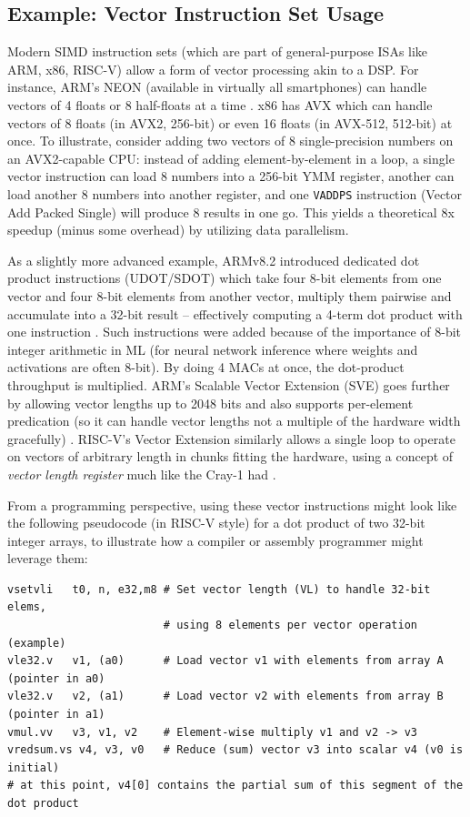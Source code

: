 \subsection{Example: Vector Instruction Set Usage}
Modern SIMD instruction sets (which are part of general-purpose ISAs like ARM, x86, RISC-V) allow a form of vector processing akin to a DSP. For instance, ARM’s NEON (available in virtually all smartphones) can handle vectors of 4 floats or 8 half-floats at a time \cite{arm2020neon}. x86 has AVX which can handle vectors of 8 floats (in AVX2, 256-bit) or even 16 floats (in AVX-512, 512-bit) at once. To illustrate, consider adding two vectors of 8 single-precision numbers on an AVX2-capable CPU: instead of adding element-by-element in a loop, a single vector instruction can load 8 numbers into a 256-bit YMM register, another can load another 8 numbers into another register, and one \texttt{VADDPS} instruction (Vector Add Packed Single) will produce 8 results in one go. This yields a theoretical 8x speedup (minus some overhead) by utilizing data parallelism.

As a slightly more advanced example, ARMv8.2 introduced dedicated dot product instructions (UDOT/SDOT) which take four 8-bit elements from one vector and four 8-bit elements from another vector, multiply them pairwise and accumulate into a 32-bit result – effectively computing a 4-term dot product with one instruction \cite{andrews2017dot, arm2021accelerating}. Such instructions were added because of the importance of 8-bit integer arithmetic in ML (for neural network inference where weights and activations are often 8-bit). By doing 4 MACs at once, the dot-product throughput is multiplied. ARM’s Scalable Vector Extension (SVE) goes further by allowing vector lengths up to 2048 bits and also supports per-element predication (so it can handle vector lengths not a multiple of the hardware width gracefully) \cite{stevens2017arm}. RISC-V’s Vector Extension similarly allows a single loop to operate on vectors of arbitrary length in chunks fitting the hardware, using a concept of \textit{vector length register} much like the Cray-1 had \cite{riscv-vector-extension}.

From a programming perspective, using these vector instructions might look like the following pseudocode (in RISC-V style) for a dot product of two 32-bit integer arrays, to illustrate how a compiler or assembly programmer might leverage them:

{\small
\begin{verbatim}
vsetvli   t0, n, e32,m8 # Set vector length (VL) to handle 32-bit elems, 
                        # using 8 elements per vector operation (example)
vle32.v   v1, (a0)      # Load vector v1 with elements from array A (pointer in a0)
vle32.v   v2, (a1)      # Load vector v2 with elements from array B (pointer in a1)
vmul.vv   v3, v1, v2    # Element-wise multiply v1 and v2 -> v3
vredsum.vs v4, v3, v0   # Reduce (sum) vector v3 into scalar v4 (v0 is initial)
# at this point, v4[0] contains the partial sum of this segment of the dot product
\end{verbatim}
}

